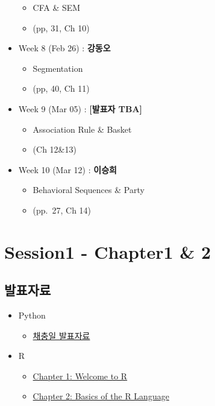 \documentclass[
]{book}
\providecommand{\tightlist}{%
  \setlength{\itemsep}{0pt}\setlength{\parskip}{0pt}}
\begin{document}
\begin{itemize}
  \begin{itemize}
  \tightlist
  \item
    CFA \& SEM
  \item
    (pp, 31, Ch 10)
  \end{itemize}
\item
  Week 8 (Feb 26) : \textbf{강동오}

  \begin{itemize}
  \tightlist
  \item
    Segmentation
  \item
    (pp, 40, Ch 11)
  \end{itemize}
\item
  Week 9 (Mar 05) : \textbf{{[}발표자 TBA{]}}

  \begin{itemize}
  \tightlist
  \item
    Association Rule \& Basket
  \item
    (Ch 12\&13)
  \end{itemize}
\item
  Week 10 (Mar 12) : \textbf{이승희}

  \begin{itemize}
  \tightlist
  \item
    Behavioral Sequences \& Party
  \item
    (pp.~27, Ch 14)
  \end{itemize}
\end{itemize}

\hypertarget{session1---chapter1-2}{%
\chapter{Session1 - Chapter1 \& 2}\label{session1---chapter1-2}}

\hypertarget{uxbc1cuxd45cuxc790uxb8cc}{%
\section{발표자료}\label{uxbc1cuxd45cuxc790uxb8cc}}

\begin{itemize}
\tightlist
\item
  Python

  \begin{itemize}
  \tightlist
  \item
    \href{https://drive.google.com/file/d/1YXzvYAqYfOlsTKB6k1K0GBP6RCqTRr-S/view?usp=sharing}{채충일 발표자료}
  \end{itemize}
\item
  R

  \begin{itemize}
  \tightlist
  \item
    \href{http://r-marketing.r-forge.r-project.org/Instructor/Chapter1/Chapter1-ChapmanFeit.html\#/}{Chapter 1: Welcome to R}
  \item
    \href{http://r-marketing.r-forge.r-project.org/Instructor/Chapter2/Chapter2-ChapmanFeit.html\#/}{Chapter 2: Basics of the R Language}
  \end{itemize}
\end{itemize}
\end{document}
